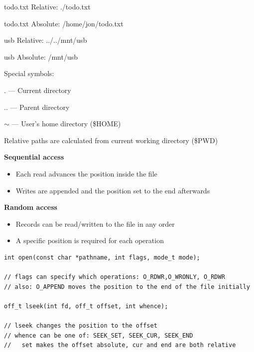 \begin{slide}
    

    todo.txt Relative: ./todo.txt

    todo.txt Absolute: /home/jon/todo.txt

    usb Relative: ../../mnt/usb

    usb Absolute: /mnt/usb
    \bigskip

    Special symbols:

    \leftspace{}. --- Current directory
    
    \leftspace{}.. ---  Parent directory

    \leftspace{}$\mathsf{\sim}$ --- User's home directory (\$HOME)
    \bigskip

    Relative paths are calculated from current working directory (\$PWD)

\end{slide}

\begin{slide}
    

    \textbf{Sequential access}
    \begin{itemize}
        \item Each read advances the position inside the file
        \item Writes are appended and the position set to the end afterwards
    \end{itemize}
	\bigskip

    \textbf{Random access}
    \begin{itemize}
        \item Records can be read/written to the file in any order
        \item A specific position is required for each operation
    \end{itemize}

\end{slide}

\begin{slide}
    

    \begin{verbatim}
int open(const char *pathname, int flags, mode_t mode);

// flags can specify which operations: O_RDWR,O_WRONLY, O_RDWR
// also: O_APPEND moves the position to the end of the file initially

off_t lseek(int fd, off_t offset, int whence);

// lseek changes the position to the offset
// whence can be one of: SEEK_SET, SEEK_CUR, SEEK_END
//   set makes the offset absolute, cur and end are both relative
  \end{verbatim}

\end{slide}
  
